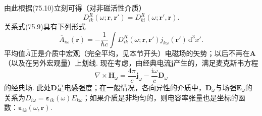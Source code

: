 由此根据(75.10)立刻可得（对非磁活性介质）
\begin{equation}
D_{ik}^{R}(\omega;\bm{r},\bm{r}')=D_{ki}^{R}(\omega;\bm{r}',\bm{r}).
\end{equation}
关系式(75.9)具有下列形式
\begin{equation}
\overline{A}_{i\omega}(\bm{r})=-\frac{1}{\hbar c}\int D_{ik}^{R}(\omega;\bm{r},\bm{r}')j_{k\omega}(\bm{r}')\,\mathrm{d}^{3}x'.
\end{equation}
平均值$\overline{A}$正是介质中宏观（完全平均，见本节开头）电磁场的矢势；以后不再在$\bm{A}$（以及在另外宏观量）上划线. 现在考虑，由经典电流$\bm{j}$产生的，满足麦克斯韦方程
\begin{equation*}
\nabla\times\bm{H}_{\omega}=\frac{4\pi}{c}\bm{j}_{\omega}-\frac{\mathrm{i}\omega}{c}\bm{D}_{\omega}
\end{equation*}
的经典场. 此处$\bm{D}$是电感强度；在一般情况，各向异性的介质中，$\bm{D}_{\omega}$与场强$\bm{E}_{\omega}$的关系为$D_{i\omega}=\bm{\varepsilon}_{ik}(\omega)E_{k\omega}$；如果介质是非均匀的，则电容率张量也是坐标的函数：$\bm{\varepsilon}_{ik}(\omega,\bm{r})$.


